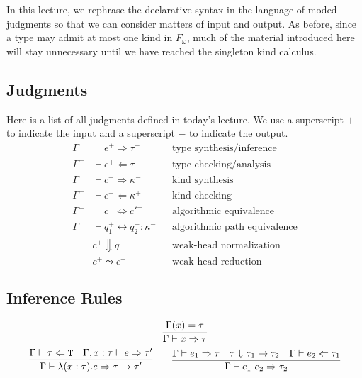 
In this lecture, we rephrase the declarative syntax in the language of moded
judgments so that we can consider matters of input and output. As before, since
a type may admit at most one kind in $F_\omega$, much of the material introduced
here will stay unnecessary until we have reached the singleton kind calculus.

\subsection{Judgments}

Here is a list of all judgments defined in today's lecture. We use a superscript $+$
to indicate the input and a superscript $-$ to indicate the output.
\begin{align*}
  \Gamma^+ &\vdash e^+ \Rightarrow \tau^- &&\text{type synthesis/inference}\\
  \Gamma^+ &\vdash e^+ \Leftarrow \tau^+ &&\text{type checking/analysis}\\
  \Gamma^+ &\vdash c^+ \Rightarrow \kappa^- &&\text{kind synthesis}\\
  \Gamma^+ &\vdash c^+ \Leftarrow \kappa^+ &&\text{kind checking}\\
  \Gamma^+ &\vdash c^+ \Leftrightarrow c'^+ &&\text{algorithmic equivalence}\\
  \Gamma^+ &\vdash q_1^+ \leftrightarrow q_2^+ : \kappa^- &&\text{algorithmic path equivalence}\\
  &c^+ \Downarrow q^- &&\text{weak-head normalization}\\
  &c^+ \leadsto c^- &&\text{weak-head reduction}
\end{align*}

\subsection{Inference Rules}

\begin{judgment}
\[ \infer{\Gamma \vdash x \Rightarrow \tau}{\Gamma(x) = \tau} \]
\[
  \infer
    {\Gamma \vdash \lambda (x : \tau).e \Rightarrow \tau \rightarrow \tau'}
    {\Gamma \vdash \tau \Leftarrow \T
    &\Gamma,x : \tau \vdash e \Rightarrow \tau'
    }
  \qquad
  \infer
    {\Gamma \vdash e_1~e_2 \Rightarrow \tau_2}
    {\Gamma \vdash e_1 \Rightarrow \tau
    &\tau \Downarrow \tau_1 \rightarrow \tau_2
    &\Gamma \vdash e_2 \Leftarrow \tau_1
    }
\]
\end{judgment}

